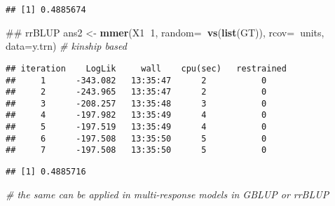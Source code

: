 \documentclass[]{article}
\newenvironment{Shaded}{\begin{snugshade}}{\end{snugshade}}
\newcommand{\KeywordTok}[1]{\textcolor[rgb]{0.13,0.29,0.53}{\textbf{#1}}}
\newcommand{\DataTypeTok}[1]{\textcolor[rgb]{0.13,0.29,0.53}{#1}}
\newcommand{\DecValTok}[1]{\textcolor[rgb]{0.00,0.00,0.81}{#1}}
\newcommand{\StringTok}[1]{\textcolor[rgb]{0.31,0.60,0.02}{#1}}
\newcommand{\CommentTok}[1]{\textcolor[rgb]{0.56,0.35,0.01}{\textit{#1}}}
\newcommand{\OperatorTok}[1]{\textcolor[rgb]{0.81,0.36,0.00}{\textbf{#1}}}
\newcommand{\NormalTok}[1]{#1}
\begin{document}
\begin{verbatim}
## [1] 0.4885674
\end{verbatim}

\begin{Shaded}
\begin{Highlighting}[]
\NormalTok{## rrBLUP}
\NormalTok{ans2 <-}\StringTok{ }\KeywordTok{mmer}\NormalTok{(X1}\OperatorTok{~}\DecValTok{1}\NormalTok{,}
             \DataTypeTok{random=}\OperatorTok{~}\KeywordTok{vs}\NormalTok{(}\KeywordTok{list}\NormalTok{(GT)), }
             \DataTypeTok{rcov=}\OperatorTok{~}\NormalTok{units,}
             \DataTypeTok{data=}\NormalTok{y.trn) }\CommentTok{# kinship based}
\end{Highlighting}
\end{Shaded}

\begin{verbatim}
## iteration    LogLik     wall    cpu(sec)   restrained
##     1      -343.082   13:35:47      2           0
##     2      -243.965   13:35:47      2           0
##     3      -208.257   13:35:48      3           0
##     4      -197.982   13:35:49      4           0
##     5      -197.519   13:35:49      4           0
##     6      -197.508   13:35:50      5           0
##     7      -197.508   13:35:50      5           0
\end{verbatim}

\begin{Shaded}
\end{Shaded}

\begin{verbatim}
## [1] 0.4885716
\end{verbatim}

\begin{Shaded}
\begin{Highlighting}[]
\CommentTok{# the same can be applied in multi-response models in GBLUP or rrBLUP}
\end{Highlighting}
\end{Shaded}
\end{document}
